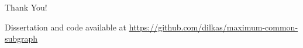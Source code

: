 \documentclass{beamer}
\begin{document}
\section{}

{
  \begin{frame}{Thank You!}
    \begin{block}{Dissertation and code available at}
    \url{https://github.com/dilkas/maximum-common-subgraph}
    \end{block}
  \end{frame}
}
\end{document}

